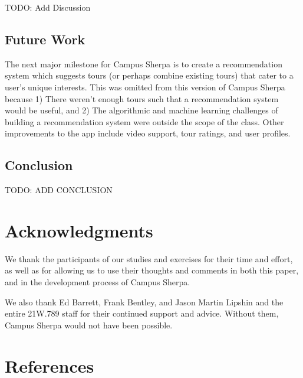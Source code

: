 \documentclass{sigchi}
\begin{document}
TODO: Add Discussion

\subsection{Future Work}

The next major milestone for Campus Sherpa is to create a recommendation system which suggests tours (or perhaps combine existing tours) that cater to a user's unique interests. This was omitted from this version of Campus Sherpa because 1) There weren't enough tours such that a recommendation system would be useful, and 2) The algorithmic and machine learning challenges of building a recommendation system were outside the scope of the class. Other improvements to the app include video support, tour ratings, and user profiles.

\subsection{Conclusion}

TODO: ADD CONCLUSION

\section{Acknowledgments}

We thank the participants of our studies and exercises for their time and effort, as well as for allowing us
to use their thoughts and comments in both this paper, and in the development process of Campus Sherpa.

We also thank Ed Barrett, Frank Bentley, and Jason Martin Lipshin and the entire 21W.789 staff for their continued support and advice. Without them, Campus Sherpa would not have been possible.

%
%
%
%
%
\balance

\section{References}



\end{document}
